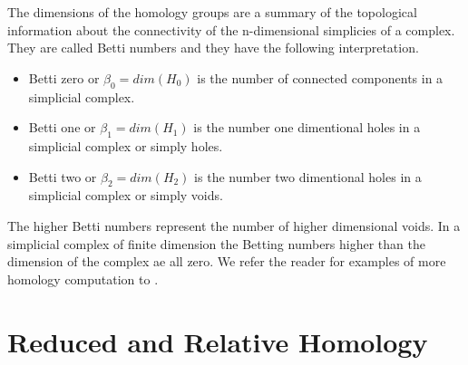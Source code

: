The dimensions of the homology groups are a summary of the topological information about the connectivity of the n-dimensional simplicies of a complex. They are called Betti numbers and they have the following interpretation.

\begin{itemize}
    \item Betti zero or $\beta_0 = dim(H_0)$ is the number of connected components in a simplicial complex.
    \item Betti one  or $\beta_1 = dim(H_1)$ is the number one dimentional holes in a simplicial complex or simply holes.
    \item Betti two  or $\beta_2 = dim(H_2)$ is the number two dimentional holes in a simplicial complex or simply voids.
\end{itemize}

The higher Betti numbers represent the number of higher dimensional voids. In a simplicial complex of finite dimension the Betting numbers higher than the dimension of the complex ae all zero. We refer the reader for examples of more homology computation to \cite[p. 88]{comp-topo}.






\section{Reduced and Relative Homology}

